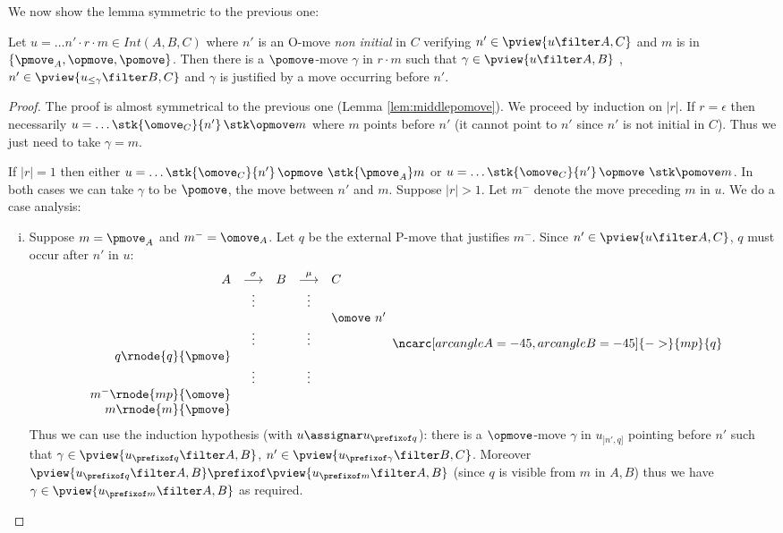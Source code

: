 We now show the lemma symmetric to the previous one:
\begin{lemma}
\label{lem:middleopmove}
Let $u = \ldots n' \cdot r \cdot m \in Int(A,B,C)$ where
$n'$ is an O-move \emph{non initial} in $C$ verifying $n' \in \pview{u\filter A,C}$ and $m$ is in $\{\pmove_A, \opmove, \pomove\}$. Then there is a $\pomove$-move $\gamma$ in $r \cdot m$ such that $\gamma \in \pview{u\filter A,B}$ , $n' \in \pview{u_{\leq \gamma} \filter B,C}$ and $\gamma$ is justified by a move occurring before $n'$.
\end{lemma}
\begin{proof}
The proof is almost symmetrical to the previous one (Lemma \ref{lem:middlepomove}). We proceed by induction on $|r|$.
If $r=\epsilon$ then necessarily $u = \ldots \stk {\omove_C} {n'} \thinspace\stk \opmove m$ where $m$ points before $n'$ (it cannot point to $n'$
since $n'$ is not initial in $C$). Thus we just need to take $\gamma = m$.

If $|r|=1$ then either 
$u = \ldots \stk {\omove_C} {n'} \thinspace\opmove\thinspace\thinspace\stk{\pmove_A} m$
or $u = \ldots \stk {\omove_C} {n'} \thinspace\opmove\thinspace\thinspace\stk \pomove m$.
In both cases we can take $\gamma$ to be $\pomove$, the move between $n'$ and $m$.
Suppose $|r|>1$. Let $m^-$ denote the move preceding $m$ in $u$.
We do a case analysis:
\begin{enumerate}[i.]
\item Suppose $m = \pmove_A$ and $m^- = \omove_A$.
Let $q$ be the external P-move that justifies $m^-$.
Since $n' \in \pview{u\filter A,C}$, $q$ must occur after $n'$ in $u$:
$$ 
\begin{array}{rcccl}
A & \stackrel\sigma{\longrightarrow} & B & \stackrel\mu{\longrightarrow} & C \\
&\vdots&&\vdots\\
&&&& \omove\ n'\\
&\vdots&&\vdots  \\
q\rnode{q}{\pmove}  \\
&\vdots&&\vdots  \\
m^- \rnode{mp}{\omove}  \\
m \rnode{m}{\pmove}  \\
\end{array}
\ncarc[arcangleA=-45,arcangleB=-45]{->}{mp}{q}
 $$  
Thus we can use the induction hypothesis (with $u\assignar u_{\prefixof q}$): there is a $\opmove$-move $\gamma$ 
in $u_{]n',q]}$ pointing before $n'$ such that $\gamma \in \pview{u_{\prefixof q} \filter A,B}$, $n' \in \pview{u_{\prefixof \gamma} \filter B,C}$.
Moreover $\pview{u_{\prefixof q} \filter A,B} \prefixof \pview{u_{\prefixof m} \filter A,B}$ (since $q$ is visible from $m$ in $A,B$) thus we have $\gamma \in \pview{u_{\prefixof m} \filter A,B}$ as required.


\end{enumerate}
\end{proof}
